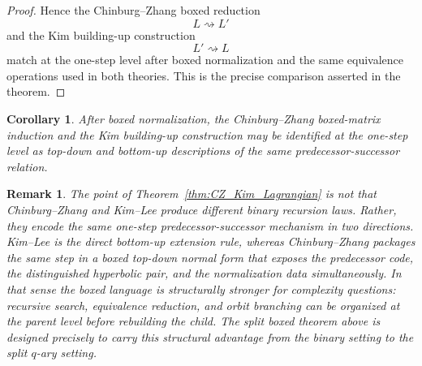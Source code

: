 \documentclass[12pt]{article}
\newtheorem{cor}[theorem]{Corollary}
\newtheorem{remark}[theorem]{Remark}
\newenvironment{blueblock}{\begingroup\color{blue}}{\endgroup}
\begin{document}
\begin{blueblock}
\begin{proof}
Hence the Chinburg--Zhang boxed reduction
\[
L \rightsquigarrow L'
\]
and the Kim building-up construction
\[
L' \rightsquigarrow L
\]
match at the one-step level after boxed normalization and the same equivalence operations used in both theories. This is the precise comparison asserted in the theorem.
\end{proof}

\begin{cor}
After boxed normalization, the Chinburg--Zhang boxed-matrix induction and the Kim building-up construction may be identified at the one-step level as top-down and bottom-up descriptions of the same predecessor-successor relation.
\end{cor}

\begin{remark}
\rm
The point of Theorem~\ref{thm:CZ_Kim_Lagrangian} is not that Chinburg--Zhang and Kim--Lee produce different binary recursion laws. Rather, they encode the same one-step predecessor-successor mechanism in two directions. Kim--Lee is the direct bottom-up extension rule, whereas Chinburg--Zhang packages the same step in a boxed top-down normal form that exposes the predecessor code, the distinguished hyperbolic pair, and the normalization data simultaneously. In that sense the boxed language is structurally stronger for complexity questions: recursive search, equivalence reduction, and orbit branching can be organized at the parent level before rebuilding the child. The split boxed theorem above is designed precisely to carry this structural advantage from the binary setting to the split \(q\)-ary setting.
\end{remark}
\end{blueblock}
\end{document}
